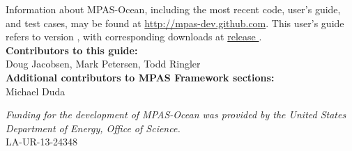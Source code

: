 Information about MPAS-Ocean, including the most recent code, user's guide, and test cases, may be found at \url{http://mpas-dev.github.com}.  This user's guide refers to version \version, with corresponding downloads at \href{http://mpas-dev.github.com/ocean/release_\version/release_\version.html}{release \version}. \\

\vspace{8pt}
\noindent
{\bf Contributors to this guide:}\\
Doug Jacobsen, Mark Petersen, Todd Ringler\\
{\bf Additional contributors to MPAS Framework sections:}\\
Michael Duda

\vspace{8pt}
\noindent
{\scriptsize
{\it Funding for the development of MPAS-Ocean was provided by the United States Department of Energy, Office of Science.} \\
LA-UR-13-24348}




